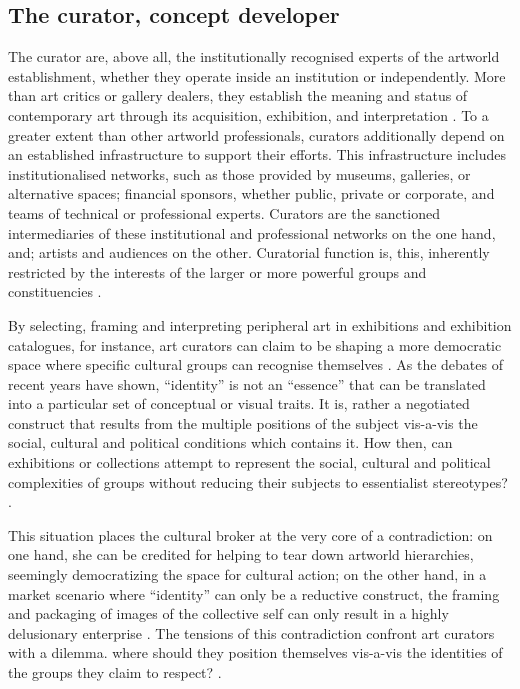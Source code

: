\subsection{The curator, concept developer}
The curator are, above all, the institutionally recognised experts of the artworld establishment, whether they operate inside an institution or independently. More than art critics or gallery dealers, they establish the meaning and status of contemporary art through its acquisition, exhibition, and interpretation \autocite[p. 22]{Thi_book}. To a greater extent than other artworld professionals, curators additionally depend on an established infrastructure to support their efforts. This infrastructure includes institutionalised networks, such as those provided by museums, galleries, or alternative spaces; financial sponsors, whether public, private or corporate, and teams of technical or professional experts. Curators are the sanctioned intermediaries of these institutional and professional networks on the one hand, and; artists and audiences on the other. Curatorial function is, this, inherently restricted by the interests of the larger or more powerful groups and constituencies \autocite[p. 22]{Thi_book}.

By selecting, framing and interpreting peripheral art in exhibitions and exhibition catalogues, for instance, art curators can claim to be shaping a more democratic space where specific cultural groups can recognise themselves \autocite[p. 23]{Thi_book}. As the debates of recent years have shown, “identity” is not an “essence” that can be translated into a particular set of conceptual or visual traits. It is, rather a negotiated construct that results from the multiple positions of the subject vis-a-vis the social, cultural and political conditions which contains it. How then, can exhibitions or collections attempt to represent the social, cultural and political complexities of groups without reducing their subjects to essentialist stereotypes? \autocite[p. 23]{Thi_book}.

This situation places the cultural broker at the very core of a contradiction: on one hand, she can be credited for helping to tear down artworld hierarchies, seemingly democratizing the space for cultural action; on the other hand, in a market scenario where “identity” can only be a reductive construct, the framing and packaging of images of the collective self can only result in a highly delusionary enterprise \autocite[p. 23-24]{Thi_book}. The tensions of this contradiction confront art curators with a dilemma. where should they position themselves vis-a-vis the identities of the groups they claim to respect? \autocite[p. 24]{Thi_book}.



